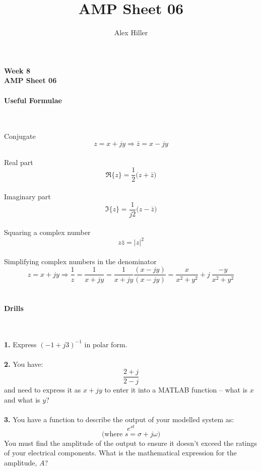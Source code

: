\documentclass{article}
\author{Alex Hiller}
\title{AMP Sheet 06}
\begin{document}

\paragraph{Week 8 \\ AMP Sheet 06}

\paragraph{Useful Formulae} \

  Conjugate
  $$
    z = x +jy \Rightarrow \bar{z} = x - jy
  $$ \\

  Real part
  $$
    \Re \{ z \}  = \frac{1}{2} \big( z + \bar{z}  \big)    
  $$ \\ 

  Imaginary part
  $$
    \Im \{ z \} = \frac{1}{j2} \big( z - \bar{z} \big)
  $$ \\

  Squaring a complex number
  $$
    z\bar{z} = | z |^{2}
  $$ \\

  Simplifying complex numbers in the denominator
  $$
    z = x + jy \Rightarrow \frac{1}{z} = \frac{1}{x+jy} = \frac{1}{x+jy}\frac{(x-jy)}{(x-jy)} = \frac{x}{x^2 + y^2} + j \ \frac{-y}{x^2 + y^2}
  $$ \\

\paragraph{Drills} \ 
  
  \textbf{1.} Express $(-1 + j3)^{-1}$ in polar form. \\ \\
  \textbf{2.} You have: $$\frac{2+j}{2-j}$$ and need to express it as $x+jy$ to enter it into a MATLAB function -- what is $x$ and what is $y$? \\ \\
  \textbf{3.} You have a function to describe the output of your modelled system as: $$e^{st}$$ $$\big(\text{where } s = \sigma + j \omega)$$ You must find the amplitude of the output to ensure it doesn't exceed the ratings of your electrical components. What is the mathematical expression for the amplitude, $A$? \\ 
\end{document}
